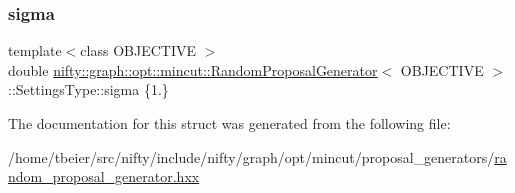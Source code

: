 \mbox{\label{structnifty_1_1graph_1_1opt_1_1mincut_1_1RandomProposalGenerator_1_1SettingsType_a949050fd4426f0b54dc1add474eda7b7}} 
\subsubsection{\texorpdfstring{sigma}{sigma}}
{\footnotesize\ttfamily template$<$class O\+B\+J\+E\+C\+T\+I\+VE $>$ \\
double \hyperlink{classnifty_1_1graph_1_1opt_1_1mincut_1_1RandomProposalGenerator}{nifty\+::graph\+::opt\+::mincut\+::\+Random\+Proposal\+Generator}$<$ O\+B\+J\+E\+C\+T\+I\+VE $>$\+::Settings\+Type\+::sigma \{1.\}}



The documentation for this struct was generated from the following file\+:\begin{DoxyCompactItemize}
\item 
/home/tbeier/src/nifty/include/nifty/graph/opt/mincut/proposal\+\_\+generators/\hyperlink{random__proposal__generator_8hxx}{random\+\_\+proposal\+\_\+generator.\+hxx}\end{DoxyCompactItemize}
